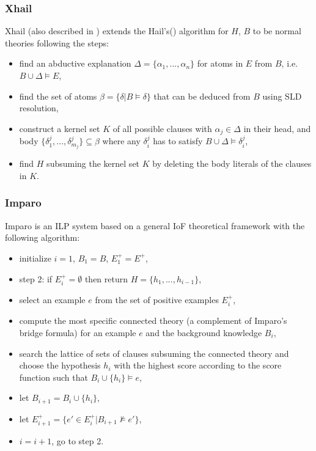 \subsubsection{Xhail\cite{ray2009nonmonotonic}}
Xhail (also described in \cite{kimber2012learning}\cite{corapi2011nonmonotonic}) extends the Hail's(\cite{ray2005phdHybrid}) algorithm for $H$, $B$ to be normal theories following the steps:
\begin{itemize}
\item find an abductive explanation $\Delta=\{\alpha_1, ..., \alpha_n\}$ for atoms in $E$ from $B$, i.e. $B \cup \Delta \models E$,
\item find the set of atoms $\beta=\{\delta | B \models \delta\}$ that can be deduced from $B$ using SLD resolution,
\item construct a kernel set $K$ of all possible clauses with $\alpha_j \in \Delta$ in their head, and body $\{\delta^j_1, ..., \delta^j_{m_j}\} \subseteq \beta$ where any $\delta^j_i$ has to satisfy $B \cup \Delta \models \delta^j_i$,
\item find $H$ subsuming the kernel set $K$ by deleting the body literals of the clauses in $K$.
\end{itemize}

\subsubsection{Imparo\cite{kimber2012learning}}
Imparo is an ILP system based on a general IoF theoretical framework with the following algorithm:
\begin{itemize}
\item initialize $i=1$, $B_1=B$, $E^+_1=E^+$,
\item step 2: if $E^+_i = \emptyset$ then return $H=\{h_1, ..., h_{i-1}\}$,
\item select an example $e$ from the set of positive examples $E^+_i$,
\item compute the most specific connected theory (a complement of Imparo's bridge formula) for an example $e$ and the background knowledge $B_i$,
\item search the lattice of sets of clauses subsuming the connected theory and choose the hypothesis $h_i$ with the highest score according to the score function such that $B_i \cup \{h_i\} \models e$,
\item let $B_{i+1}=B_i \cup \{h_i\}$,
\item let $E^+_{i+1}=\{e' \in E^+_i | B_{i+1} \not\models e'\}$,
\item $i=i+1$, go to step 2.
\end{itemize}

